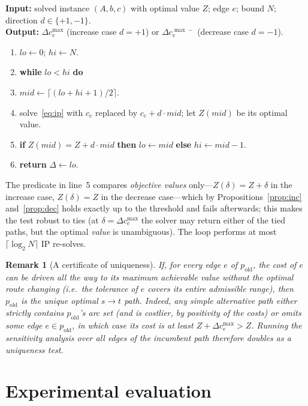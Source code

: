\documentclass[10pt,twocolumn]{article}
\newtheorem{remark}{Remark}
\begin{document}
\begin{algorithm}[t]
\caption{Integer sensitivity threshold via binary search.}
\textbf{Input:} solved instance $(A,b,c)$ with optimal value $Z$; edge $e$; bound $N$;
direction $d\in\{+1,-1\}$.\\
\textbf{Output:} $\Delta c^{\max}_e$ (increase case $d=+1$) or $\Delta c^{\max\!-}_e$
(decrease case $d=-1$).
\begin{enumerate}
  \item $lo\gets 0$; $hi\gets N$.
  \item \textbf{while} $lo<hi$ \textbf{do}
  \item \quad $mid\gets\lceil(lo+hi+1)/2\rceil$.
  \item \quad solve~\eqref{eq:ip} with $c_e$ replaced by $c_e+d\cdot mid$; let $Z(mid)$ be
        its optimal value.
  \item \quad \textbf{if} $Z(mid)=Z+d\cdot mid$ \textbf{then} $lo\gets mid$
        \textbf{else} $hi\gets mid-1$.
  \item \textbf{return} $\Delta\gets lo$.
\end{enumerate}
\end{algorithm}

The predicate in line~5 compares \emph{objective values} only---$Z(\delta)=Z+\delta$ in the
increase case, $Z(\delta)=Z$ in the decrease case---which by
Propositions~\ref{prop:inc} and~\ref{prop:dec} holds exactly up to the threshold and fails
afterwards; this makes the test robust to ties (at $\delta=\Delta c^{\max}_e$ the solver may
return either of the tied paths, but the optimal \emph{value} is unambiguous). The loop
performs at most $\lceil\log_2 N\rceil$ IP re-solves.

\begin{remark}[A certificate of uniqueness]
\label{rem:unique}
If, for \emph{every} edge $e$ of $p_{\text{old}}$, the cost of $e$ can be driven all the way
to its maximum achievable value without the optimal route changing (i.e.\ the tolerance of
$e$ covers its entire admissible range), then $p_{\text{old}}$ is the \emph{unique} optimal
$s\!\to\!t$ path. Indeed, any simple alternative path either strictly contains
$p_{\text{old}}$'s arc set (and is costlier, by positivity of the costs) or omits some edge
$e\in p_{\text{old}}$, in which case its cost is at least $Z+\Delta c^{\max}_e>Z$. Running
the sensitivity analysis over all edges of the incumbent path therefore doubles as a
uniqueness test.
\end{remark}

\section{Experimental evaluation}
\label{sec:exp}
\end{document}
